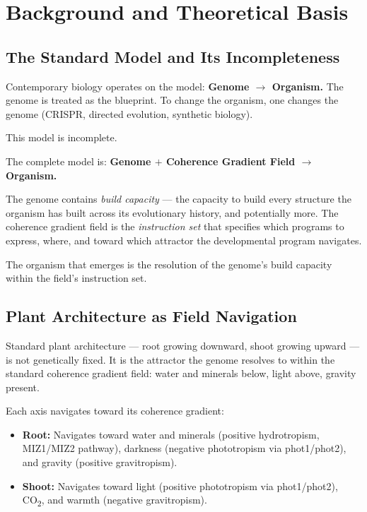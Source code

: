 \documentclass[10pt, a4paper]{article}
\begin{document}
\vspace{1em}


\section{Background and Theoretical Basis}

\subsection{The Standard Model and Its Incompleteness}

Contemporary biology operates on the model:
\textbf{Genome $\rightarrow$ Organism.}
The genome is treated as the blueprint.
To change the organism, one changes the genome
(CRISPR, directed evolution, synthetic biology).

This model is incomplete.

The complete model is:
\textbf{Genome $+$ Coherence Gradient Field $\rightarrow$ Organism.}

The genome contains \textit{build capacity} ---
the capacity to build every structure the organism has built
across its evolutionary history, and potentially more.
The coherence gradient field is the \textit{instruction set}
that specifies which programs to express, where, and toward
which attractor the developmental program navigates.

The organism that emerges is the resolution of the genome's
build capacity within the field's instruction set.

\subsection{Plant Architecture as Field Navigation}

Standard plant architecture --- root growing downward,
shoot growing upward --- is not genetically fixed.
It is the attractor the genome resolves to within
the standard coherence gradient field:
water and minerals below, light above, gravity present.

Each axis navigates toward its coherence gradient:
\begin{itemize}[itemsep=0.1em]
  \item \textbf{Root:} Navigates toward water and minerals
    (positive hydrotropism, MIZ1/MIZ2 pathway),
    darkness (negative phototropism via phot1/phot2),
    and gravity (positive gravitropism).
  \item \textbf{Shoot:} Navigates toward light
    (positive phototropism via phot1/phot2),
    CO\textsubscript{2}, and warmth
    (negative gravitropism).
\end{itemize}
\end{document}

